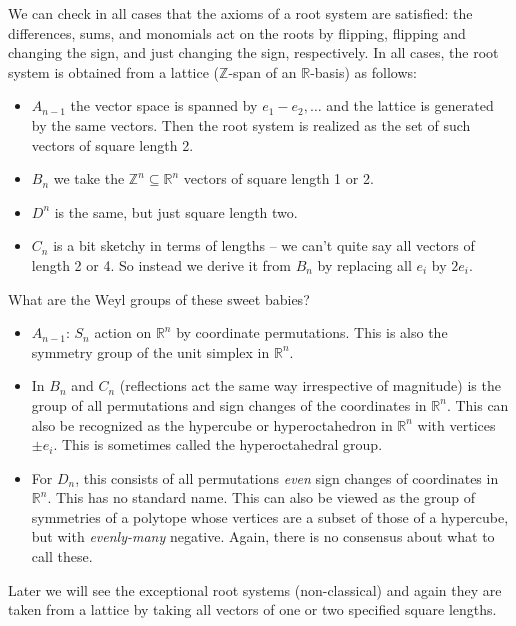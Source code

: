 \documentclass[12pt]{article}
\theoremstyle{nonumberbreak}
\theoremstyle{changebreak}
\theoremstyle{nonumberbreak}
\theoremstyle{change}
\newcommand*{\Z}{
\mathbb{Z}
}
\newcommand*{\R}{
\mathbb{R}
}
\begin{document}
We can check in all cases that the axioms of a root system are satisfied: the differences, sums, and monomials act
on the roots by flipping, flipping and changing the sign, and just changing the sign, respectively.
In all cases, the root system is obtained from a lattice ($\Z$-span of an $\R$-basis) as follows:
\begin{itemize}
	\item $A_{n-1}$ the vector space is spanned by $e_1-e_2,\dots$ and the lattice is generated by the same vectors.
	Then the root system is realized as the set of such vectors of square length 2.
	\item $B_n$ we take the $\Z^n\subseteq\R^n$ vectors of square length 1 or 2.
	\item $D^n$ is the same, but just square length two.
	\item $C_n$ is a bit sketchy in terms of lengths -- we can't quite say all vectors of length 2 or 4. So instead
	we derive it from $B_n$ by replacing all $e_i$ by $2e_i$.
\end{itemize}
What are the Weyl groups of these sweet babies?
\begin{itemize}
	\item $A_{n-1}$: $S_n$ action on $\R^n$ by coordinate permutations. This is also the symmetry group of the unit simplex in $\R^n$.
	\item In $B_n$ and $C_n$ (reflections act the same way irrespective of magnitude) is the group of all permutations and sign changes 
	of the coordinates in $\R^n$. This can also be recognized as the hypercube or hyperoctahedron in $\R^n$ with vertices $\pm e_i$. This is 
	sometimes called the hyperoctahedral group.
	\item For $D_n$, this consists of all permutations \textit{even} sign changes of coordinates in $\R^n$. This has no 
	standard name. This can also be viewed as the group of symmetries of a polytope whose vertices are a subset of 
	those of a hypercube, but with \textit{evenly-many} negative. Again, there is no consensus about what to call these.
\end{itemize}
Later we will see the exceptional root systems (non-classical) and again they are taken from a lattice by taking all vectors of one or two specified square lengths.
\end{document}
